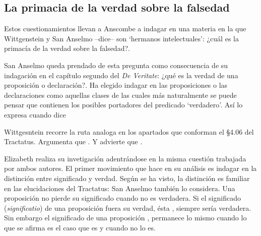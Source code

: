 \subsection{La primacia de la verdad sobre la falsedad}
Estos cuestionamientos llevan a Anscombe a indagar en una materia en la que
Wittgenstein y San Anselmo --dice-- son `hermanos intelectuales': ¿cuál es la
primacía de la verdad sobre la falsedad?.

San Anselmo queda prendado de esta pregunta como consecuencia de su indagación
en el capítulo segundo del \emph{De Veritate}: ¿qué es la verdad de una
proposición o declaración?. Ha elegido indagar en las proposiciones o las
declaraciones como aquellas clases de las cuales más naturalmente se puede
pensar que contienen los posibles portadores del predicado `verdadero'. Así lo
expresa cuando dice \autocite{De Veritate c. 2}

Wittgesntein recorre la ruta analoga en los apartados que conforman el \S4.06
del Tractatus. Argumenta que \autocite[\S4.06]{wittgenstein1922tractatus}. Y advierte que
\autocite[\S4.061]{wittgenstein1922tractatus}.

Elizabeth realiza su invetigación adentrándose en la misma cuestión trabajada
por ambos autores. El primer movimiento que hace en su análisis es indagar en la
distinción entre significado y verdad. Según se ha visto, la distinción es
familiar en las elucidaciones del Tractatus: 
\autocite[\S~4.061]{wittgenstein1922tractatus} San Anselmo también lo considera.
Una proposición no pierde su significado cuando no es verdadera. Si el
significado (\emph{significatio}) de una proposición fuera su verdad, ésta
, siempre sería verdadera. Sin embargo el
significado de una proposición , permanece lo mismo cuando lo que se afirma es el
caso que es y cuando no lo es.

